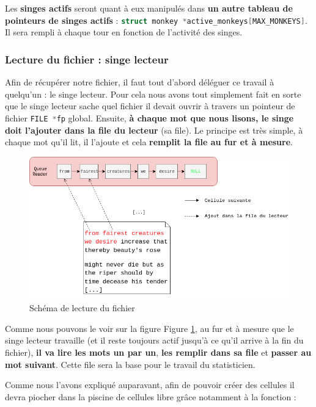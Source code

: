 \documentclass{article}
\newcommand{\inlinecode}[2]{\colorbox{white}{\lstinline[language=#1]$#2$}}
\begin{document}
Les \textbf{singes actifs} seront quant à eux manipulés dans \textbf{un autre tableau de pointeurs de singes actifs} : \inlinecode{C}{struct monkey *active_monkeys[MAX_MONKEYS]}\label{lst:active}. Il sera rempli à chaque tour en fonction de l'activité des singes.


\subsubsection{Lecture du fichier : singe lecteur}
\label{subsct:reader}

Afin de récupérer notre fichier, il faut tout d'abord déléguer ce travail à quelqu'un : le singe lecteur. Pour cela nous avons tout simplement fait en sorte que le singe lecteur sache quel fichier il devait ouvrir à travers un pointeur de fichier \inlinecode{C}{FILE *fp} global. Ensuite, \textbf{à chaque mot que nous lisons, le singe doit l'ajouter dans la file du lecteur} (sa file). Le principe est très simple, à chaque mot qu'il lit, il l'ajoute et cela \textbf{remplit la file au fur et à mesure}.

\begin{figure}[ht!]
\centering
\includegraphics[scale=0.37]{schemacells.png}
\caption{Schéma de lecture du fichier}
\label{fig:schema_cells}
\end{figure}

Comme nous pouvons le voir sur la figure Figure \ref{fig:schema_cells}, au fur et à mesure que le singe lecteur travaille (et il reste toujours actif jusqu'à ce qu'il arrive à la fin du fichier), \textbf{il va lire les mots un par un}, \textbf{les remplir dans sa file} et \textbf{passer au mot suivant}. Cette file sera la base pour le travail du statisticien.

Comme nous l'avons expliqué auparavant, afin de pouvoir créer des cellules il devra piocher dans la piscine de cellules libre grâce notamment à la fonction :
\end{document}
